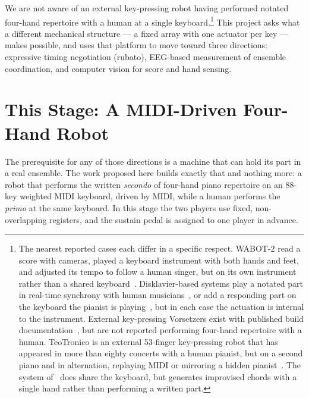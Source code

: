 \documentclass[11pt]{article}
\begin{document}
We are not aware of an external key-pressing robot having performed notated four-hand repertoire with
a human at a single keyboard.\footnote{The nearest reported cases each differ in a specific respect.
WABOT-2 read a score with cameras, played a keyboard instrument with both hands and feet, and
adjusted its tempo to follow a human singer, but on its own instrument rather than a shared
keyboard~\cite{kato1987wabot2}. Disklavier-based systems play a notated part in real-time synchrony
with human musicians~\cite{muens2017,yamaha2016ensemble}, or add a responding part on the keyboard
the pianist is playing~\cite{risset1996duet,ghostkeys2025}, but in each case the actuation is
internal to the instrument. External key-pressing Vorsetzers exist with published build
documentation~\cite{logos_playerpiano}, but are not reported performing four-hand repertoire with a
human. TeoTronico is an external 53-finger key-pressing robot that has appeared in more than eighty
concerts with a human pianist, but on a second piano and in alternation, replaying MIDI or mirroring
a hidden pianist~\cite{teotronico}. The system of~\cite{wang2024cooperative} does share the keyboard,
but generates improvised chords with a single hand rather than performing a written part.} This
project asks what a different mechanical structure --- a fixed array with one actuator per key ---
makes possible, and uses that platform to move toward three directions: expressive timing
negotiation (rubato), EEG-based measurement of ensemble coordination, and computer vision for score
and hand sensing.

\section{This Stage: A MIDI-Driven Four-Hand Robot}
The prerequisite for any of those directions is a machine that can hold its part in a real ensemble.
The work proposed here builds exactly that and nothing more: a robot that performs the written
\emph{secondo} of four-hand piano repertoire on an 88-key weighted MIDI keyboard, driven by MIDI, while
a human performs the \emph{primo} at the same keyboard. In this stage the two players use fixed,
non-overlapping registers, and the sustain pedal is assigned to one player in advance.
\end{document}
